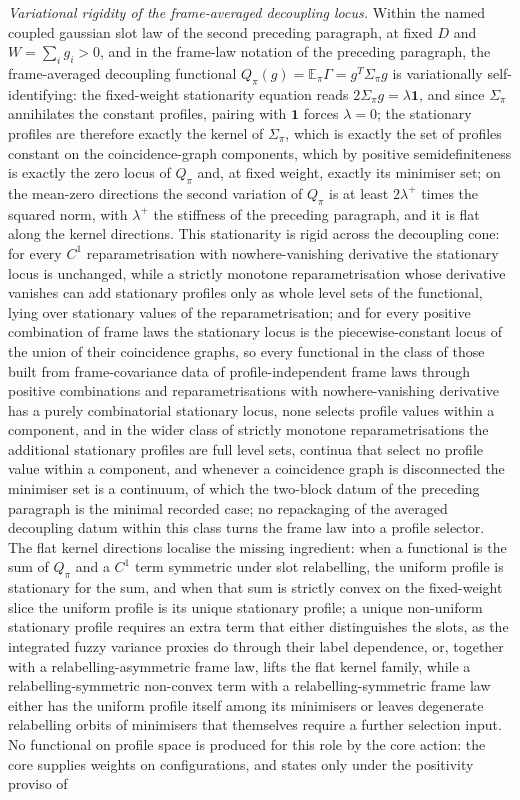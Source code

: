\emph{Variational rigidity of the frame-averaged decoupling locus.} Within the named coupled gaussian slot law of the second preceding paragraph, at fixed \(D\) and \(W=\sum_{i}g_{i}>0\), and in the frame-law notation of the preceding paragraph, the frame-averaged decoupling functional \(Q_{\pi}(g)=\mathbb{E}_{\pi}\Gamma=g^{T}\Sigma_{\pi}g\) is variationally self-identifying: the fixed-weight stationarity equation reads \(2\Sigma_{\pi}g=\lambda\mathbf{1}\), and since \(\Sigma_{\pi}\) annihilates the constant profiles, pairing with \(\mathbf{1}\) forces \(\lambda=0\); the stationary profiles are therefore exactly the kernel of \(\Sigma_{\pi}\), which is exactly the set of profiles constant on the coincidence-graph components, which by positive semidefiniteness is exactly the zero locus of \(Q_{\pi}\) and, at fixed weight, exactly its minimiser set; on the mean-zero directions the second variation of \(Q_{\pi}\) is at least \(2\lambda^{+}\) times the squared norm, with \(\lambda^{+}\) the stiffness of the preceding paragraph, and it is flat along the kernel directions. This stationarity is rigid across the decoupling cone: for every \(C^{1}\) reparametrisation with nowhere-vanishing derivative the stationary locus is unchanged, while a strictly monotone reparametrisation whose derivative vanishes can add stationary profiles only as whole level sets of the functional, lying over stationary values of the reparametrisation; and for every positive combination of frame laws the stationary locus is the piecewise-constant locus of the union of their coincidence graphs, so every functional in the class of those built from frame-covariance data of profile-independent frame laws through positive combinations and reparametrisations with nowhere-vanishing derivative has a purely combinatorial stationary locus, none selects profile values within a component, and in the wider class of strictly monotone reparametrisations the additional stationary profiles are full level sets, continua that select no profile value within a component, and whenever a coincidence graph is disconnected the minimiser set is a continuum, of which the two-block datum of the preceding paragraph is the minimal recorded case; no repackaging of the averaged decoupling datum within this class turns the frame law into a profile selector. The flat kernel directions localise the missing ingredient: when a functional is the sum of \(Q_{\pi}\) and a \(C^{1}\) term symmetric under slot relabelling, the uniform profile is stationary for the sum, and when that sum is strictly convex on the fixed-weight slice the uniform profile is its unique stationary profile; a unique non-uniform stationary profile requires an extra term that either distinguishes the slots, as the integrated fuzzy variance proxies do through their label dependence, or, together with a relabelling-asymmetric frame law, lifts the flat kernel family, while a relabelling-symmetric non-convex term with a relabelling-symmetric frame law either has the uniform profile itself among its minimisers or leaves degenerate relabelling orbits of minimisers that themselves require a further selection input. No functional on profile space is produced for this role by the core action: the core supplies weights on configurations, and states only under the positivity proviso of 